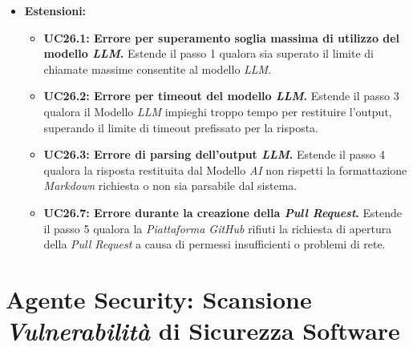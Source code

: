 \documentclass[12pt, a4paper]{article}
\begin{document}
\begin{itemize}
\begin{enumerate}
        \item Il modello \textit{LLM} elabora il codice e restituisce al sistema le informazioni tecniche formattate strutturalmente con la sintassi \textit{Markdown}.
        \item Il sistema effettua una chiamata alle \textit{API} della \textit{Piattaforma GitHub} per aprire una \textit{Pull Request} contenente il documento \texttt{API.md} finale.
        \item Il sistema registra il successo dell'attività, ne aggiorna lo stato a "Completato" nella dashboard di monitoraggio (UC22.1.2) e rende disponibile allo Sviluppatore il report dell'operazione (UC25).
    \end{enumerate}
    \item \textbf{Estensioni:}
    \begin{itemize}
        \item \textbf{UC26.1: Errore per superamento soglia massima di utilizzo del modello \textit{LLM}.} Estende il passo 1 qualora sia superato il limite di chiamate massime consentite al modello \textit{LLM}.
        \item \textbf{UC26.2: Errore per timeout del modello \textit{LLM}.} Estende il passo 3 qualora il Modello \textit{LLM} impieghi troppo tempo per restituire l'output, superando il limite di timeout prefissato per la risposta.
        \item \textbf{UC26.3: Errore di parsing dell'output \textit{LLM}.} Estende il passo 4 qualora la risposta restituita dal Modello \textit{AI} non rispetti la formattazione \textit{Markdown} richiesta o non sia parsabile dal sistema.
        \item \textbf{UC26.7: Errore durante la creazione della \textit{Pull Request}.} Estende il passo 5 qualora la \textit{Piattaforma GitHub} rifiuti la richiesta di apertura della \textit{Pull Request} a causa di permessi insufficienti o problemi di rete.
    \end{itemize}
\end{itemize}


\newpage
\section{Agente Security: Scansione \textit{Vulnerabilità} di Sicurezza Software}
\end{document}
